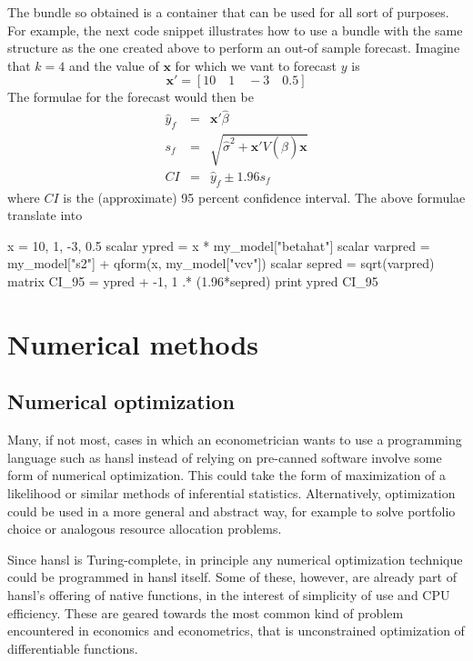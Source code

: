 The bundle so obtained is a container that can be used for all sort of
purposes. For example, the next code snippet illustrates how to use
a bundle with the same structure as the one created above to perform
an out-of sample forecast. Imagine that $k=4$ and the value of
$\mathbf{x}$ for which we vant to forecast $y$ is
\[
  \mathbf{x}' = [ 10 \quad 1  \quad -3 \quad 0.5 ]
\]
The formulae for the forecast would then be
\begin{eqnarray*}
  \hat{y}_f & = & \mathbf{x}'\hat{\beta} \\
  s_f & = & \sqrt{\hat{\sigma}^2 + \mathbf{x}'V(\hat{\beta})\mathbf{x}} \\
  CI & = & \hat{y}_f \pm 1.96 s_f 
\end{eqnarray*}
where $CI$ is the (approximate) 95 percent confidence interval. The
above formulae translate into
\begin{code}
  x = { 10, 1, -3, 0.5 }
  scalar ypred    = x * my_model["betahat"]
  scalar varpred  = my_model["s2"] + qform(x, my_model["vcv"])
  scalar sepred   = sqrt(varpred)
  matrix CI_95    = ypred + {-1, 1} .* (1.96*sepred)
  print ypred CI_95
\end{code}




\chapter{Numerical methods}

\section{Numerical optimization}
\label{sec:hp-numopt}

Many, if not most, cases in which an econometrician wants to use a
programming language such as hansl instead of relying on pre-canned
software involve some form of numerical optimization. This could take
the form of maximization of a likelihood or similar methods of
inferential statistics. Alternatively, optimization could be used in a
more general and abstract way, for example to solve portfolio choice
or analogous resource allocation problems.

Since hansl is Turing-complete, in principle any numerical
optimization technique could be programmed in hansl itself. Some of
these, however, are already part of hansl's offering of native
functions, in the interest of simplicity of use and CPU
efficiency. These are geared towards the most common kind of problem
encountered in economics and econometrics, that is unconstrained
optimization of differentiable functions.

